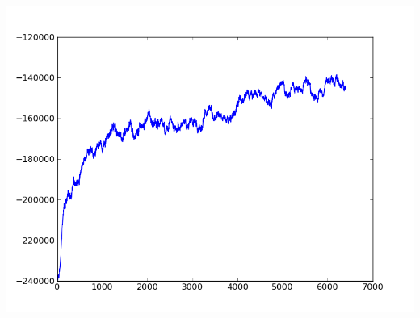 \documentclass[10pt]{article}
\begin{document}
\begin{center}
\includegraphics[scale=0.35]{logscores.png} 
\end{center}
\end{document}
